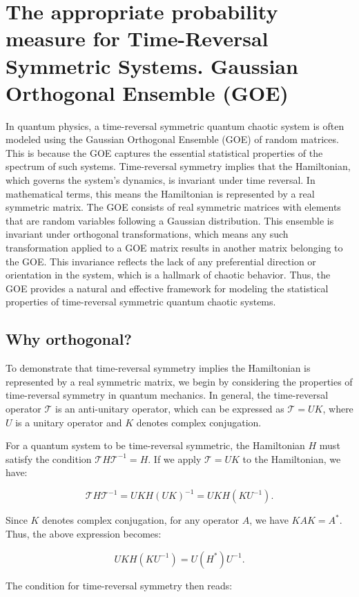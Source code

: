\documentclass[10pt]{article}
\begin{document}
\section{The appropriate probability measure for Time-Reversal Symmetric Systems. Gaussian Orthogonal Ensemble (GOE)}
In quantum physics, a time-reversal symmetric quantum chaotic system is often modeled 
using the Gaussian Orthogonal Ensemble (GOE) of random matrices. This is because the 
GOE captures the essential statistical properties of the spectrum of such systems. 
Time-reversal symmetry implies that the Hamiltonian, which governs the system's 
dynamics, is invariant under time reversal. In mathematical terms, this means the 
Hamiltonian is represented by a real symmetric matrix. The GOE consists of real 
symmetric matrices with elements that are random variables following a Gaussian 
distribution. This ensemble is invariant under orthogonal transformations, which 
means any such transformation applied to a GOE matrix results in another matrix 
belonging to the GOE. This invariance reflects the lack of any preferential 
direction or orientation in the system, which is a hallmark of chaotic behavior. 
Thus, the GOE provides a natural and effective framework for modeling the statistical 
properties of time-reversal symmetric quantum chaotic systems.

\subsection{Why orthogonal?}
To demonstrate that time-reversal symmetry implies the Hamiltonian is represented by 
a real symmetric matrix, we begin by considering the properties of time-reversal 
symmetry in quantum mechanics. In general, the time-reversal operator $\mathcal{T}$ 
is an anti-unitary operator, which can be expressed as $\mathcal{T} = UK$, where $U$ 
is a unitary operator and $K$ denotes complex conjugation.

For a quantum system to be time-reversal symmetric, the Hamiltonian $H$ must satisfy 
the condition $\mathcal{T}H\mathcal{T}^{-1} = H$. If we apply $\mathcal{T} = UK$ to 
the Hamiltonian, we have:

\[
\mathcal{T}H\mathcal{T}^{-1} = UKH(UK)^{-1} = UKH(KU^{-1}).
\]

Since $K$ denotes complex conjugation, for any operator $A$, we have $KAK = A^*$. 
Thus, the above expression becomes:

\[
UKH(KU^{-1}) = U(H^*)U^{-1}.
\]

The condition for time-reversal symmetry then reads:
\end{document}

